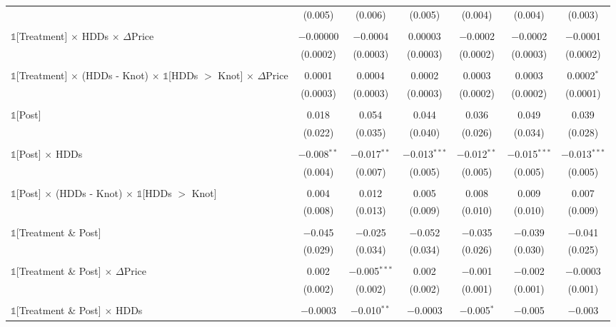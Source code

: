\begin{table}[!htbp]
\begin{longtable}{@{\extracolsep{15pt}}lcccccc}
  & (0.005) & (0.006) & (0.005) & (0.004) & (0.004) & (0.003) \\ 
  & & & & & & \\ 
 $\mathbb{1}$[Treatment] $\times$ HDDs $\times$ $\Delta$Price & $-$0.00000 & $-$0.0004 & 0.00003 & $-$0.0002 & $-$0.0002 & $-$0.0001 \\ 
  & (0.0002) & (0.0003) & (0.0003) & (0.0002) & (0.0003) & (0.0002) \\ 
  & & & & & & \\ 
 $\mathbb{1}$[Treatment] $\times$ (HDDs - Knot) $\times$ $\mathbb{1}$[HDDs $>$ Knot] $\times$ $\Delta$Price & 0.0001 & 0.0004 & 0.0002 & 0.0003 & 0.0003 & 0.0002$^{*}$ \\ 
  & (0.0003) & (0.0003) & (0.0003) & (0.0002) & (0.0002) & (0.0001) \\ 
  & & & & & & \\ 
 $\mathbb{1}$[Post] & 0.018 & 0.054 & 0.044 & 0.036 & 0.049 & 0.039 \\ 
  & (0.022) & (0.035) & (0.040) & (0.026) & (0.034) & (0.028) \\ 
  & & & & & & \\ 
 $\mathbb{1}$[Post] $\times$ HDDs & $-$0.008$^{**}$ & $-$0.017$^{**}$ & $-$0.013$^{***}$ & $-$0.012$^{**}$ & $-$0.015$^{***}$ & $-$0.013$^{***}$ \\ 
  & (0.004) & (0.007) & (0.005) & (0.005) & (0.005) & (0.005) \\ 
  & & & & & & \\ 
 $\mathbb{1}$[Post] $\times$ (HDDs - Knot) $\times$ $\mathbb{1}$[HDDs $>$ Knot] & 0.004 & 0.012 & 0.005 & 0.008 & 0.009 & 0.007 \\ 
  & (0.008) & (0.013) & (0.009) & (0.010) & (0.010) & (0.009) \\ 
  & & & & & & \\ 
 $\mathbb{1}$[Treatment \& Post] & $-$0.045 & $-$0.025 & $-$0.052 & $-$0.035 & $-$0.039 & $-$0.041 \\ 
  & (0.029) & (0.034) & (0.034) & (0.026) & (0.030) & (0.025) \\ 
  & & & & & & \\ 
 $\mathbb{1}$[Treatment \& Post] $\times$ $\Delta$Price & 0.002 & $-$0.005$^{***}$ & 0.002 & $-$0.001 & $-$0.002 & $-$0.0003 \\ 
  & (0.002) & (0.002) & (0.002) & (0.001) & (0.001) & (0.001) \\ 
  & & & & & & \\ 
 $\mathbb{1}$[Treatment \& Post] $\times$ HDDs & $-$0.0003 & $-$0.010$^{**}$ & $-$0.0003 & $-$0.005$^{*}$ & $-$0.005 & $-$0.003 \\ 

\end{longtable}
\end{table}
